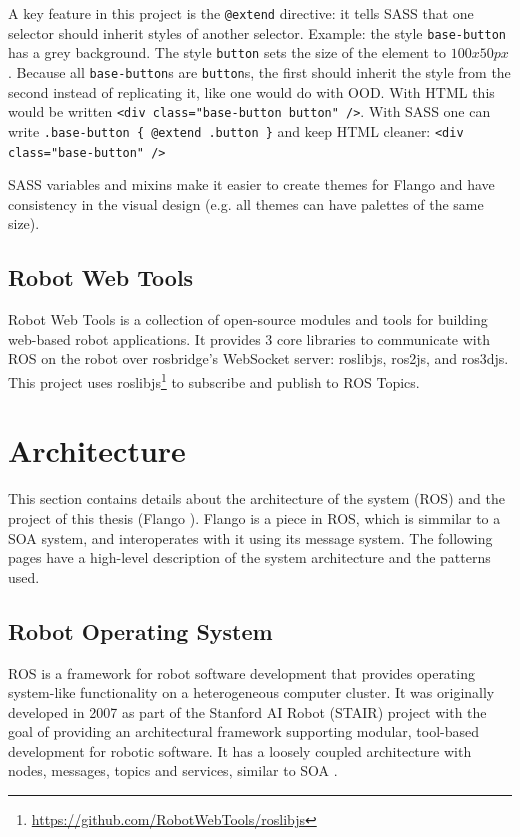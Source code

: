A key feature in this project is the \lstinline$@extend$ directive: it tells \ac{SASS} that one selector should inherit styles of another selector.
Example: the style \texttt{base-button} has a grey background. The style \texttt{button} sets the size of the element to $100 x 50 px$.
Because all \texttt{base-button}s are \texttt{button}s, the first should inherit the style from the second instead of replicating it, like one would do with \ac{OOD}.
With \ac{HTML} this would be written \lstinline$<div class="base-button button" />$.
With SASS one can write \lstinline$.base-button { @extend .button }$ and keep \ac{HTML} cleaner: \lstinline$<div class="base-button" />$

SASS variables and mixins make it easier to create themes for Flango \cm and have consistency in the visual design (e.g. all themes can have palettes of the same size).

\subsection{Robot Web Tools}
Robot Web Tools is a collection of open-source modules and tools for building web-based robot applications.
It provides 3 core libraries to communicate with \ac{ROS} on the robot over rosbridge's WebSocket server: roslibjs, ros2js, and ros3djs.
This project uses roslibjs\footnote{\url{https://github.com/RobotWebTools/roslibjs}} to subscribe and publish to ROS Topics.

\section{Architecture}
This section contains details about the architecture of the system (ROS) and the project of this thesis (Flango \cm ). 
Flango \cm is a piece in \ac{ROS}, which is simmilar to a \ac{SOA} system, and interoperates with it using its message system.
The following pages have a high-level description of the system architecture and the patterns used.

\subsection{Robot Operating System}
\ac{ROS} is a framework for robot software development that provides operating system-like functionality on a heterogeneous computer cluster. 
It was originally developed in 2007 as part of the Stanford AI Robot (STAIR) project with the goal of providing an architectural framework supporting modular, tool-based development for robotic software.
It has a loosely coupled architecture with nodes, messages, topics and services, similar to \ac{SOA} \cite{ROS:2009}.

